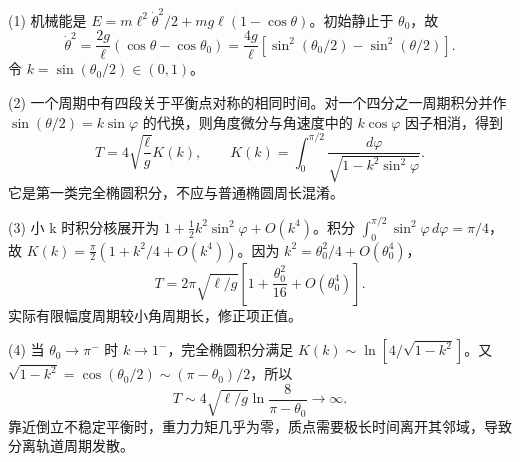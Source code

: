 (1) 机械能是 \(E=m\ell^2\dot\theta^2/2+mg\ell(1-\cos\theta)\)。初始静止于 \(\theta _{0}\)，故
\[
\dot\theta^2=\frac{2g}{\ell}(\cos\theta-\cos\theta_0)
=\frac{4g}{\ell}\left[\sin^2(\theta_0/2)-\sin^2(\theta/2)\right].
\]
令 \(k=\sin(\theta_0/2)\in(0,1)\)。

(2) 一个周期中有四段关于平衡点对称的相同时间。对一个四分之一周期积分并作 \(\sin(\theta/2)=k\sin\varphi\) 的代换，则角度微分与角速度中的 \(k\cos\varphi\) 因子相消，得到
\[
T=4\sqrt{\frac\ell g}K(k),\qquad
K(k)=\int_0^{\pi/2}\frac{d\varphi}{\sqrt{1-k^2\sin^2\varphi}}.
\]
它是第一类完全椭圆积分，不应与普通椭圆周长混淆。

(3) 小 k 时积分核展开为 \(1+\frac12k^2\sin^2\varphi+O(k^4)\)。积分 \(\int_0^{\pi/2}\sin^2\varphi\,d\varphi=\pi/4\)，故 \(K(k)=\frac\pi2(1+k^2/4+O(k^4))\)。因为 \(k^2=\theta_0^2/4+O(\theta_0^4)\)，
\[
T=2\pi\sqrt{\ell/g}\left[1+\frac{\theta_0^2}{16}+O(\theta_0^4)\right].
\]
实际有限幅度周期较小角周期长，修正项正值。

(4) 当 \(\theta _{0}\to \pi ^{-}\) 时 \(k\to1^-\)，完全椭圆积分满足 \(K(k)\sim\ln[4/\sqrt{1-k^2}]\)。又 \(\sqrt{1-k^2}=\cos(\theta_0/2)\sim(\pi-\theta_0)/2\)，所以
\[
T\sim4\sqrt{\ell/g}\ln\frac8{\pi-\theta_0}\to\infty.
\]
靠近倒立不稳定平衡时，重力力矩几乎为零，质点需要极长时间离开其邻域，导致分离轨道周期发散。
